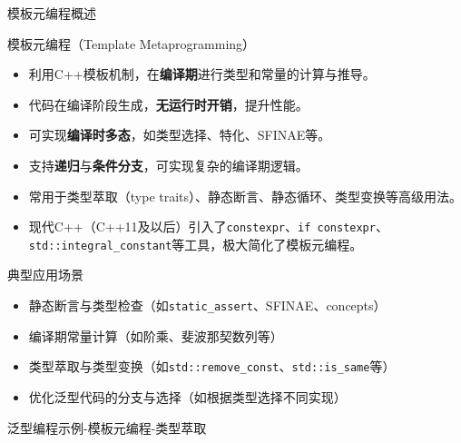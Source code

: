 \documentclass[UTF8,aspectratio=169]{beamer}
\begin{document}
\begin{frame}{模板元编程概述}
    \begin{ytublock}{模板元编程（Template Metaprogramming）}
        \begin{itemize}
            \item 利用C++模板机制，在\textbf{编译期}进行类型和常量的计算与推导。
            \item 代码在编译阶段生成，\textbf{无运行时开销}，提升性能。
            \item 可实现\textbf{编译时多态}，如类型选择、特化、SFINAE等。
            \item 支持\textbf{递归}与\textbf{条件分支}，可实现复杂的编译期逻辑。
            \item 常用于类型萃取（type traits）、静态断言、静态循环、类型变换等高级用法。
            \item 现代C++（C++11及以后）引入了\texttt{constexpr}、\texttt{if constexpr}、\texttt{std::integral\_constant}等工具，极大简化了模板元编程。
        \end{itemize}
    \end{ytublock}
    \begin{ytublock}{典型应用场景}
        \begin{itemize}
            \item 静态断言与类型检查（如\texttt{static\_assert}、SFINAE、concepts）
            \item 编译期常量计算（如阶乘、斐波那契数列等）
            \item 类型萃取与类型变换（如\texttt{std::remove\_const}、\texttt{std::is\_same}等）
            \item 优化泛型代码的分支与选择（如根据类型选择不同实现）
        \end{itemize}
    \end{ytublock}
\end{frame}

\begin{frame}[fragile]{泛型编程示例-模板元编程-类型萃取}
    \begin{columns}
        \begin{column}{0.48\textwidth}
            \inputminted[firstline=1,lastline=14]{cpp}{code/gp_template_metaprogramming_1.cpp}
        \end{column}
        \begin{column}{0.48\textwidth}
            \inputminted[firstline=16,lastline=28]{cpp}{code/gp_template_metaprogramming_1.cpp}
        \end{column}
    \end{columns}
\end{frame}
\end{document}

